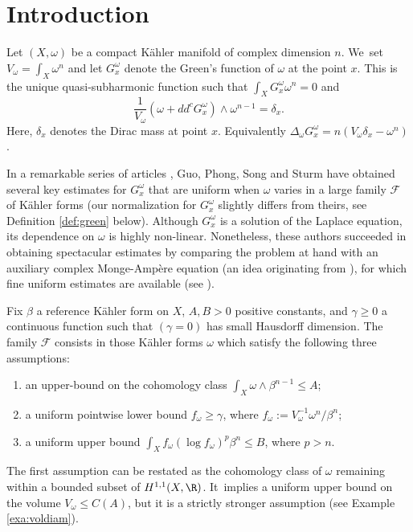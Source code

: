 \section*{Introduction}

Let $(X,\omega)$ be a compact Kähler manifold of complex dimension $n$. We~set $V_{\omega}=\int_X \omega^n$ and
let $G_x^{\omega}$ denote the Green's function of $\omega$ at the point $x$.
This is the unique quasi-subharmonic function such that $\int_X G_x^{\omega} \omega^n=0$ and
\[
\frac{1}{V_{\omega}} (\omega+dd^c G_x^{\omega}) \wedge \omega^{n-1}=\delta_x.
\]
Here, $\delta_x$ denotes the Dirac mass at point $x$. Equivalently
$\Delta_{\omega} G_x^{\omega}=n( V_{\omega} \delta_x -\omega^n)$.

In a remarkable series of articles \cite{GPS22,GPSS22,GPSS23}, Guo, Phong, Song and Sturm have
obtained several key estimates for $G_x^{\omega}$ that are uniform when $\omega$ varies
in a large family ${\mathcal F}$ of Kähler forms
(our normalization for $G_x^{\omega}$ slightly differs from theirs, see Definition \ref{def:green} below).
Although $G_x^{\omega}$ is a solution of the Laplace equation, its dependence on $\omega$ is highly non-linear.
Nonetheless, these authors succeeded in obtaining spectacular estimates by comparing the problem at hand with an auxiliary
complex Monge-Ampère equation (an idea originating from \cite{CC21}),
for which fine uniform estimates are available
(see \cite{Yau78,Kol98,EGZ09,EGZ08,DP10,BEGZ10,GL21,GPT23}).

Fix $\beta$ a reference Kähler form on $X$,
$A,B>0$ positive constants, and $\gamma \geq 0$ a continuous function such that $(\gamma =0)$ has small Hausdorff dimension.
The family ${\mathcal F}$ consists in those Kähler forms $\omega$
which satisfy the following three assumptions:
\begin{enumerate}
\item an upper-bound on the cohomology class $\int_X \omega \wedge \beta^{n-1} \leq A$;
\item a uniform pointwise lower bound $f_{\omega} \geq \gamma$, where
$f_{\omega}:=V_{\omega}^{-1}\omega^n/\beta^n$;
\item a uniform upper bound $\int_X f_{\omega} (\log f_{\omega})^p \beta^n \leq B$, where $p>n$.
\end{enumerate}

The first assumption can be restated as the cohomology class of $\omega$ remaining within a bounded subset of $H^{1,1}(X,\R)$. It~implies a uniform upper bound on the volume $V_{\omega} \leq C(A)$, but it is a strictly stronger assumption
(see Example \ref{exa:voldiam}).


